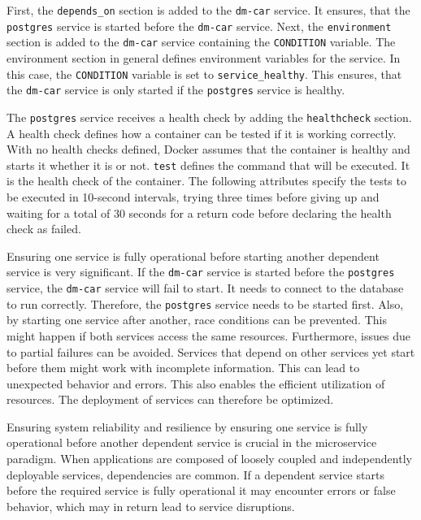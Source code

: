 First, the \texttt{depends\_on} section is added to the \texttt{dm-car} service.
It ensures, that the \texttt{postgres} service is started before the \texttt{dm-car} service.
Next, the \texttt{environment} section is added to the \texttt{dm-car} service containing the \texttt{CONDITION} variable.
The environment section in general defines environment variables for the service.
In this case, the \texttt{CONDITION} variable is set to \texttt{service\_healthy}.
This ensures, that the \texttt{dm-car} service is only started if the \texttt{postgres} service is healthy.

The \texttt{postgres} service receives a health check by adding the \texttt{healthcheck} section.
A health check defines how a container can be tested if it is working correctly.
With no health checks defined, Docker assumes that the container is healthy and starts it whether it is or not.
\texttt{test} defines the command that will be executed.
It is the health check of the container.
The following attributes specify the tests to be executed in 10-second intervals, trying three times before giving up and waiting for a total of 30 seconds for a return code before declaring the health check as failed.

Ensuring one service is fully operational before starting another dependent service is very significant.
If the \texttt{dm-car} service is started before the \texttt{postgres} service, the \texttt{dm-car} service will fail to start.
It needs to connect to the database to run correctly.
Therefore, the \texttt{postgres} service needs to be started first.
Also, by starting one service after another, race conditions can be prevented.
This might happen if both services access the same resources.
Furthermore, issues due to partial failures can be avoided.
Services that depend on other services yet start before them might work with incomplete information.
This can lead to unexpected behavior and errors.
This also enables the efficient utilization of resources.
The deployment of services can therefore be optimized.

Ensuring system reliability and resilience by ensuring one service is fully operational before another dependent service is crucial in the microservice paradigm.
When applications are composed of loosely coupled and independently deployable services, dependencies are common.
If a dependent service starts before the required service is fully operational it may encounter errors or false behavior, which may in return lead to service disruptions.

